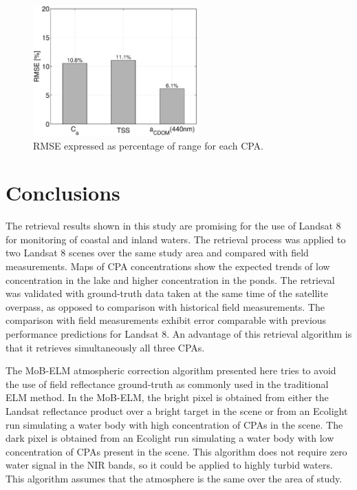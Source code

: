 \documentclass[onecolumn,3p,letterpaper]{elsarticle}
\begin{document}
\begin{figure}[htb]
	\centering
      \includegraphics[height=5cm]{./Images/RMSE_ret150421}
      \vspace{-.4cm}
      \caption{RMSE expressed as percentage of range for each CPA. \label{fig:RMSE}}
      \vspace{-.4cm}
\end{figure}

\section{Conclusions}
The retrieval results shown in this study are promising for the use of Landsat 8 for monitoring of coastal and inland waters. The retrieval process was applied to two Landsat 8 scenes over the same study area and compared with field measurements. Maps of CPA concentrations show the expected trends of low concentration in the lake and higher concentration in the ponds. The retrieval was validated with ground-truth data taken at the same time of the satellite overpass, as opposed to comparison with historical field measurements. The comparison with field measurements exhibit error comparable with previous performance predictions for Landsat 8. An advantage of this retrieval algorithm is that it retrieves simultaneously all three CPAs.

The MoB-ELM atmospheric correction algorithm presented here tries to avoid the use of field reflectance ground-truth as commonly used in the traditional ELM method. In the MoB-ELM, the bright pixel is obtained from either the Landsat reflectance product over a bright target in the scene or from an Ecolight run simulating a water body with high concentration of CPAs in the scene. The dark pixel is obtained from an Ecolight run simulating a water body with low concentration of CPAs present in the scene. This algorithm does not require zero water signal in the NIR bands, so it could be applied to highly turbid waters. This algorithm assumes that the atmosphere is the same over the area of study.
\end{document}
